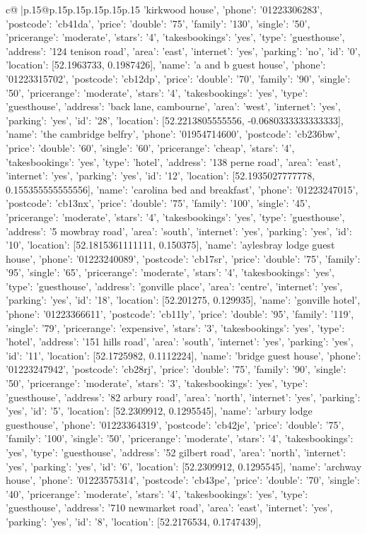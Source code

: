 \documentclass{article}
\begin{document}
{\begin{supertabular}{c@{$\;$}|p{.15\linewidth}@{}p{.15\linewidth}p{.15\linewidth}p{.15\linewidth}p{.15\linewidth}p{.15\linewidth}}
{{{'kirkwood house', 'phone': '01223306283', 'postcode': 'cb41da', 'price': {'double': '75', 'family': '130', 'single': '50'}, 'pricerange': 'moderate', 'stars': '4', 'takesbookings': 'yes', 'type': 'guesthouse'}, {'address': '124 tenison road', 'area': 'east', 'internet': 'yes', 'parking': 'no', 'id': '0', 'location': [52.1963733, 0.1987426], 'name': 'a and b guest house', 'phone': '01223315702', 'postcode': 'cb12dp', 'price': {'double': '70', 'family': '90', 'single': '50'}, 'pricerange': 'moderate', 'stars': '4', 'takesbookings': 'yes', 'type': 'guesthouse'}, {'address': 'back lane, cambourne', 'area': 'west', 'internet': 'yes', 'parking': 'yes', 'id': '28', 'location': [52.2213805555556, -0.0680333333333333], 'name': 'the cambridge belfry', 'phone': '01954714600', 'postcode': 'cb236bw', 'price': {'double': '60', 'single': '60'}, 'pricerange': 'cheap', 'stars': '4', 'takesbookings': 'yes', 'type': 'hotel'}, {'address': '138 perne road', 'area': 'east', 'internet': 'yes', 'parking': 'yes', 'id': '12', 'location': [52.1935027777778, 0.155355555555556], 'name': 'carolina bed and breakfast', 'phone': '01223247015', 'postcode': 'cb13nx', 'price': {'double': '75', 'family': '100', 'single': '45'}, 'pricerange': 'moderate', 'stars': '4', 'takesbookings': 'yes', 'type': 'guesthouse'}, {'address': '5 mowbray road', 'area': 'south', 'internet': 'yes', 'parking': 'yes', 'id': '10', 'location': [52.1815361111111, 0.150375], 'name': 'aylesbray lodge guest house', 'phone': '01223240089', 'postcode': 'cb17sr', 'price': {'double': '75', 'family': '95', 'single': '65'}, 'pricerange': 'moderate', 'stars': '4', 'takesbookings': 'yes', 'type': 'guesthouse'}, {'address': 'gonville place', 'area': 'centre', 'internet': 'yes', 'parking': 'yes', 'id': '18', 'location': [52.201275, 0.129935], 'name': 'gonville hotel', 'phone': '01223366611', 'postcode': 'cb11ly', 'price': {'double': '95', 'family': '119', 'single': '79'}, 'pricerange': 'expensive', 'stars': '3', 'takesbookings': 'yes', 'type': 'hotel'}, {'address': '151 hills road', 'area': 'south', 'internet': 'yes', 'parking': 'yes', 'id': '11', 'location': [52.1725982, 0.1112224], 'name': 'bridge guest house', 'phone': '01223247942', 'postcode': 'cb28rj', 'price': {'double': '75', 'family': '90', 'single': '50'}, 'pricerange': 'moderate', 'stars': '3', 'takesbookings': 'yes', 'type': 'guesthouse'}, {'address': '82 arbury road', 'area': 'north', 'internet': 'yes', 'parking': 'yes', 'id': '5', 'location': [52.2309912, 0.1295545], 'name': 'arbury lodge guesthouse', 'phone': '01223364319', 'postcode': 'cb42je', 'price': {'double': '75', 'family': '100', 'single': '50'}, 'pricerange': 'moderate', 'stars': '4', 'takesbookings': 'yes', 'type': 'guesthouse'}, {'address': '52 gilbert road', 'area': 'north', 'internet': 'yes', 'parking': 'yes', 'id': '6', 'location': [52.2309912, 0.1295545], 'name': 'archway house', 'phone': '01223575314', 'postcode': 'cb43pe', 'price': {'double': '70', 'single': '40'}, 'pricerange': 'moderate', 'stars': '4', 'takesbookings': 'yes', 'type': 'guesthouse'}, {'address': '710 newmarket road', 'area': 'east', 'internet': 'yes', 'parking': 'yes', 'id': '8', 'location': [52.2176534, 0.1747439], }}}
\end{supertabular}}
\end{document}
